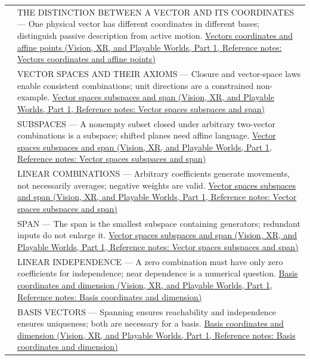 {\begin{longtable}[]{@{}
  >{\raggedright\arraybackslash}p{}
  >{\raggedright\arraybackslash}p{}@{}}
506 & THE DISTINCTION BETWEEN A VECTOR AND ITS COORDINATES --- One physical vector has different coordinates in different bases; distinguish passive description from active motion. \href{../07-Vision-XR-and-Playable-Worlds-P01/main.pdf\#nameddest=appendix-0659864c0aa3}{Vectors coordinates and affine points (Vision, XR, and Playable Worlds, Part 1, Reference notes: Vectors coordinates and affine points)} \\
507 & VECTOR SPACES AND THEIR AXIOMS --- Closure and vector-space laws enable consistent combinations; unit directions are a constrained non-example. \href{../07-Vision-XR-and-Playable-Worlds-P01/main.pdf\#nameddest=appendix-173b52c063ae}{Vector spaces subspaces and span (Vision, XR, and Playable Worlds, Part 1, Reference notes: Vector spaces subspaces and span)} \\
508 & SUBSPACES --- A nonempty subset closed under arbitrary two-vector combinations is a subspace; shifted planes need affine language. \href{../07-Vision-XR-and-Playable-Worlds-P01/main.pdf\#nameddest=appendix-173b52c063ae}{Vector spaces subspaces and span (Vision, XR, and Playable Worlds, Part 1, Reference notes: Vector spaces subspaces and span)} \\
509 & LINEAR COMBINATIONS --- Arbitrary coefficients generate movements, not necessarily averages; negative weights are valid. \href{../07-Vision-XR-and-Playable-Worlds-P01/main.pdf\#nameddest=appendix-173b52c063ae}{Vector spaces subspaces and span (Vision, XR, and Playable Worlds, Part 1, Reference notes: Vector spaces subspaces and span)} \\
510 & SPAN --- The span is the smallest subspace containing generators; redundant inputs do not enlarge it. \href{../07-Vision-XR-and-Playable-Worlds-P01/main.pdf\#nameddest=appendix-173b52c063ae}{Vector spaces subspaces and span (Vision, XR, and Playable Worlds, Part 1, Reference notes: Vector spaces subspaces and span)} \\
511 & LINEAR INDEPENDENCE --- A zero combination must have only zero coefficients for independence; near dependence is a numerical question. \href{../07-Vision-XR-and-Playable-Worlds-P01/main.pdf\#nameddest=appendix-ce0341f7ea0d}{Basis coordinates and dimension (Vision, XR, and Playable Worlds, Part 1, Reference notes: Basis coordinates and dimension)} \\
512 & BASIS VECTORS --- Spanning ensures reachability and independence ensures uniqueness; both are necessary for a basis. \href{../07-Vision-XR-and-Playable-Worlds-P01/main.pdf\#nameddest=appendix-ce0341f7ea0d}{Basis coordinates and dimension (Vision, XR, and Playable Worlds, Part 1, Reference notes: Basis coordinates and dimension)} \\

\end{longtable}}
